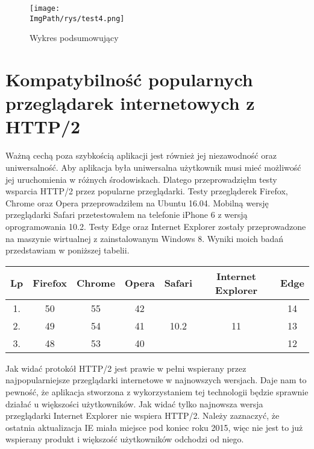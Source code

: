 \documentclass[a4paper,12pt,twoside,openany]{report}
\newcommand{\ImgPath}{.}
\begin{document}
\begin{figure}[!htbp]
	\begin{center}
\centering
\texttt{[image: \\ImgPath/rys/test4.png]}
\end{center}
	\caption{Wykres podsumowujący}
	\label{schematTest4}
\end{figure}

\section{Kompatybilność popularnych przeglądarek internetowych z HTTP/2}

Ważną cechą poza szybkością aplikacji jest również jej niezawodność oraz uniwersalność.
Aby aplikacja była uniwersalna użytkownik musi mieć możliwość jej uruchomienia w różnych środowiskach.
Dlatego przeprowadzięłm testy wsparcia HTTP/2 przez popularne przeglądarki.
Testy przegląderek Firefox, Chrome oraz Opera przeprowadziłem na Ubuntu 16.04.
Mobilną wersję przeglądarki Safari przetestowałem na telefonie iPhone 6 z wersją oprogramowania 10.2.
Testy Edge oraz Internet Explorer zostały przeprowadzone na maszynie wirtualnej z zainstalowanym Windows 8.
Wyniki moich badań przedstawiam w poniższej tabelii.

\begin{tabular}{c|c|c|c|c|c|c}
Lp & Firefox & Chrome & Opera & Safari & Internet Explorer & Edge \\ \hline
1. & \cellcolor{green!50}50 & \cellcolor{green!50}55 & \cellcolor{green!50}42 & & & \cellcolor{green!50}14 \\

2. & \cellcolor{green!50}49 & \cellcolor{green!50}54 & \cellcolor{green!50}41 & \cellcolor{green!50}10.2 & \cellcolor{red!50}11 & \cellcolor{green!50}13 \\

3. & \cellcolor{green!50}48 & \cellcolor{green!50}53 & \cellcolor{green!50}40 & & & \cellcolor{green!50}12 \\
\end{tabular}

Jak widać protokół HTTP/2 jest prawie w pełni wspierany przez najpopularniejsze przeglądarki internetowe w najnowszych wersjach.
Daje nam to pewność, że aplikacja stworzona z wykorzystaniem tej technologii będzie sprawnie działać u większości użytkowników.
Jak widać tylko najnowsza wersja przeglądarki Internet Explorer nie wspiera HTTP/2.
Należy zaznaczyć, że ostatnia aktualizacja IE miała miejsce pod koniec roku 2015, więc nie jest to już wspierany produkt i większość użytkowników odchodzi od niego.
\end{document}
